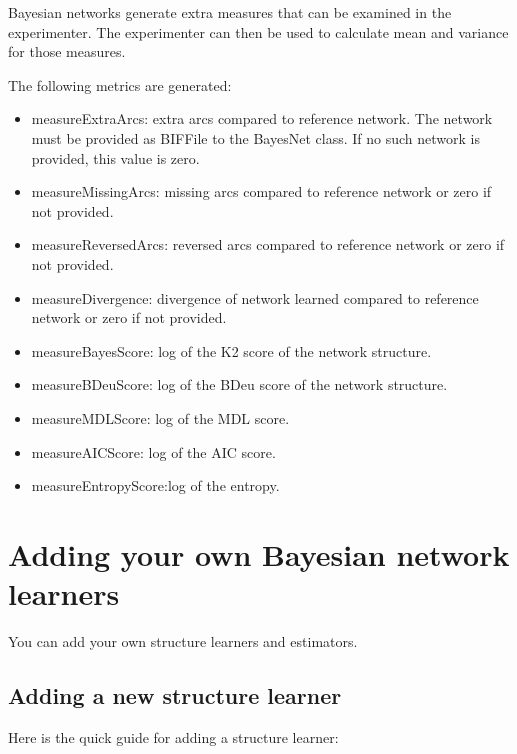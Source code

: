 Bayesian networks generate extra measures that can be examined in the experimenter.
The experimenter can then be used to calculate mean and variance for those measures.

The following metrics are generated:
\begin{itemize}
\item measureExtraArcs: extra arcs compared to reference network. The network must be
provided as BIFFile to the BayesNet class. If no such network is provided, this value is zero.
\item measureMissingArcs: missing arcs compared to reference network or zero if not provided.
\item measureReversedArcs: reversed arcs compared to reference network or zero if not provided.
\item measureDivergence: divergence of network learned compared to reference network or zero if not provided.
\item measureBayesScore: log of the K2 score of the network structure.
\item measureBDeuScore: log of the BDeu score of the network structure.
\item measureMDLScore: log of the MDL score.
\item measureAICScore: log of the AIC score.
\item measureEntropyScore:log of the entropy.
\end{itemize}


\section{Adding your own Bayesian network learners}

You can add your own structure learners and estimators.

\subsection*{Adding a new structure learner}

Here is the quick guide for adding a structure learner:

